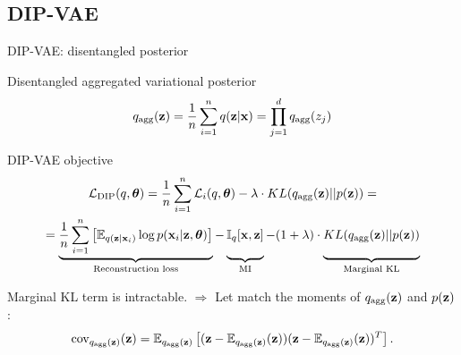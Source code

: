 \subsection{DIP-VAE}
\begin{frame}{DIP-VAE: disentangled posterior}
	\begin{block}{Disentangled aggregated variational posterior}
		\vspace{-0.3cm}
		\[
		q_{\text{agg}}(\mathbf{z}) = \frac{1}{n} \sum_{i=1}^n q(\mathbf{z} | \mathbf{x}) = \prod_{j=1}^d q_{\text{agg}}(z_j)
		\]
		\vspace{-0.6cm}
	\end{block}
	\begin{block}{DIP-VAE objective}
		\vspace{-0.7cm}
		{\small
			\begin{multline*}
				\cL_{\text{DIP}}(q, \btheta) = \frac{1}{n} \sum_{i=1}^n \cL_i(q, \btheta) -\lambda \cdot KL(q_{\text{agg}}(\bz) || p(\bz)) = \\
				= \underbrace{ \frac{1}{n} \sum_{i=1}^n \left[\bbE_{q(\bz | \bx_i)} \log p(\bx_i | \bz, \btheta)\right]}_{\text{Reconstruction loss}} - \underbrace{\vphantom{\sum_{i=1}^n} \bbI_{q} [\bx, \bz]}_{\text{MI}} - (1 + \lambda) \cdot \underbrace{\vphantom{\sum_{i=1}^n} KL(q_{\text{agg}}(\bz) || p(\bz))}_{\text{Marginal KL}}
			\end{multline*}
		}
		\vspace{-0.3cm}
	\end{block}
	Marginal KL term is intractable. $\Rightarrow$
	Let match the moments of $q_{\text{agg}}(\mathbf{z})$ and $p(\mathbf{z})$:
	\vspace{-0.3cm}
	\[
	\text{cov}_{q_{\text{agg}}(\mathbf{z})}(\mathbf{z}) = \mathbb{E}_{q_{\text{agg}}(\mathbf{z})} \left[ (\mathbf{z} - \mathbb{E}_{q_{\text{agg}}(\mathbf{z})}(\mathbf{z})) (\mathbf{z} - \mathbb{E}_{q_{\text{agg}}(\mathbf{z})}(\mathbf{z}))^T \right].
	\]
\end{frame}

